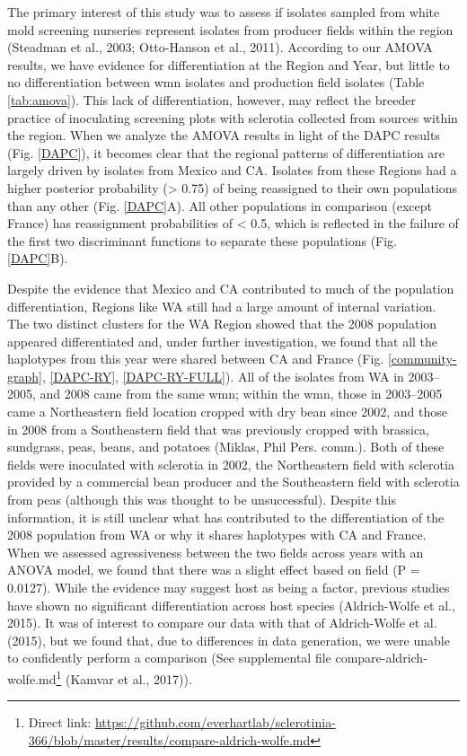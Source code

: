 \documentclass[fleqn,10pt,lineno]{wlpeerj} %
\theoremstyle{definition}
\theoremstyle{definition}
\theoremstyle{definition}
\theoremstyle{remark}
\begin{document}
The primary interest of this study was to assess if isolates sampled
from white mold screening nurseries represent isolates from producer
fields within the region (Steadman et al., 2003; Otto-Hanson et al.,
2011). According to our AMOVA results, we have evidence for
differentiation at the Region and Year, but little to no differentiation
between wmn isolates and production field isolates (Table
\ref{tab:amova}). This lack of differentiation, however, may reflect the
breeder practice of inoculating screening plots with sclerotia collected
from sources within the region. When we analyze the AMOVA results in
light of the DAPC results (Fig. \ref{DAPC}), it becomes clear that the
regional patterns of differentiation are largely driven by isolates from
Mexico and CA. Isolates from these Regions had a higher posterior
probability (\textgreater{} 0.75) of being reassigned to their own
populations than any other (Fig. \ref{DAPC}A). All other populations in
comparison (except France) has reassignment probabilities of \textless{}
0.5, which is reflected in the failure of the first two discriminant
functions to separate these populations (Fig. \ref{DAPC}B).

Despite the evidence that Mexico and CA contributed to much of the
population differentiation, Regions like WA still had a large amount of
internal variation. The two distinct clusters for the WA Region showed
that the 2008 population appeared differentiated and, under further
investigation, we found that all the haplotypes from this year were
shared between CA and France (Fig. \ref{community-graph}, \ref{DAPC-RY},
\ref{DAPC-RY-FULL}). All of the isolates from WA in 2003--2005, and 2008
came from the same wmn; within the wmn, those in 2003--2005 came a
Northeastern field location cropped with dry bean since 2002, and those
in 2008 from a Southeastern field that was previously cropped with
brassica, sundgrass, peas, beans, and potatoes (Miklas, Phil Pers.
comm.). Both of these fields were inoculated with sclerotia in 2002, the
Northeastern field with sclerotia provided by a commercial bean producer
and the Southeastern field with sclerotia from peas (although this was
thought to be unsuccessful). Despite this information, it is still
unclear what has contributed to the differentiation of the 2008
population from WA or why it shares haplotypes with CA and France. When
we assessed agressiveness between the two fields across years with an
ANOVA model, we found that there was a slight effect based on field (P =
0.0127). While the evidence may suggest host as being a factor, previous
studies have shown no significant differentiation across host species
(Aldrich-Wolfe et al., 2015). It was of interest to compare our data
with that of Aldrich-Wolfe et al. (2015), but we found that, due to
differences in data generation, we were unable to confidently perform a
comparison (See supplemental file compare-aldrich-wolfe.md\footnote{Direct
  link:
  \url{https://github.com/everhartlab/sclerotinia-366/blob/master/results/compare-aldrich-wolfe.md}}
(Kamvar et al., 2017)).
\end{document}
